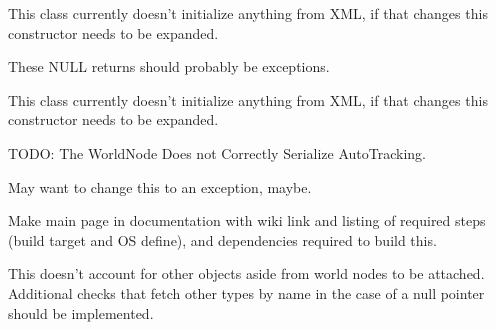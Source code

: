 \begin{DoxyRefList}
\item[\label{todo__todo000072}%
\hypertarget{todo__todo000072}{}%
Member \hyperlink{classMezzanine_1_1TimerManager_a0e4e5170256385e883bf85a54289880e}{Mezzanine\-:\-:Timer\-Manager\-:\-:Timer\-Manager} (X\-M\-L\-::\-Node \&X\-M\-L\-Node)]This class currently doesn't initialize anything from X\-M\-L, if that changes this constructor needs to be expanded.  
\item[\label{todo__todo000076}%
\hypertarget{todo__todo000076}{}%
Member \hyperlink{classMezzanine_1_1UIManager_a904d4d7a3957a13cf5e27e8d97dd1add}{Mezzanine\-:\-:U\-I\-Manager\-:\-:Get\-Atlas} (const String \&Atlas\-Name)]These N\-U\-L\-L returns should probably be exceptions.  
\item[\label{todo__todo000075}%
\hypertarget{todo__todo000075}{}%
Member \hyperlink{classMezzanine_1_1UIManager_a7d9205e916c67a75f6af55c038642b29}{Mezzanine\-:\-:U\-I\-Manager\-:\-:U\-I\-Manager} (X\-M\-L\-::\-Node \&X\-M\-L\-Node)]This class currently doesn't initialize anything from X\-M\-L, if that changes this constructor needs to be expanded.  
\item[\label{todo__todo000081}%
\hypertarget{todo__todo000081}{}%
Member \hyperlink{classMezzanine_1_1WorldNode_a417e459d58c4d612bcbbe98a328c7b50}{Mezzanine\-:\-:World\-Node\-:\-:Set\-Auto\-Tracking} (Attachable\-Base $\ast$\-Target, const Vector3 \&Local\-Direction=Vector3\-::\-Neg\-\_\-\-Unit\-\_\-\-Z(), const Vector3 \&Offset=Vector3())]T\-O\-D\-O\-: The World\-Node Does not Correctly Serialize Auto\-Tracking.  
\item[\label{todo__todo000080}%
\hypertarget{todo__todo000080}{}%
Member \hyperlink{classMezzanine_1_1WorldNode_ab088981b0bea9d73e9bfaac5f237abc8}{Mezzanine\-:\-:World\-Node\-:\-:Set\-Direction} (const Vector3 \&Direction, const \hyperlink{namespaceMezzanine_ad81c74de3529f1e643bd145173924ed3}{Mezzanine\-::\-Transform\-Space} \&T\-S=\hyperlink{namespaceMezzanine_ad81c74de3529f1e643bd145173924ed3aeb8fde3835a59be182f10353d961882d}{Mezzanine\-::\-T\-S\-\_\-\-World}, const Vector3 \&Local\-Axis=Vector3\-::\-Neg\-\_\-\-Unit\-\_\-\-Z())]May want to change this to an exception, maybe.  
\item[\label{todo__todo000019}%
\hypertarget{todo__todo000019}{}%
Namespace \hyperlink{namespaceOgre}{Ogre} ]Make main page in documentation with wiki link and listing of required steps (build target and O\-S define), and dependencies required to build this.  
\item[\label{todo__todo000079}%
\hypertarget{todo__todo000079}{}%
Member \hyperlink{worldnode_8h_a0c2361278b97bfb9147d048d81ebeab4}{operator$>$$>$} (const Mezzanine\-::\-X\-M\-L\-::\-Node \&One\-Node, \hyperlink{classMezzanine_1_1WorldNode}{Mezzanine\-::\-World\-Node} \&Ev)]This doesn't account for other objects aside from world nodes to be attached. Additional checks that fetch other types by name in the case of a null pointer should be implemented. 
\end{DoxyRefList}